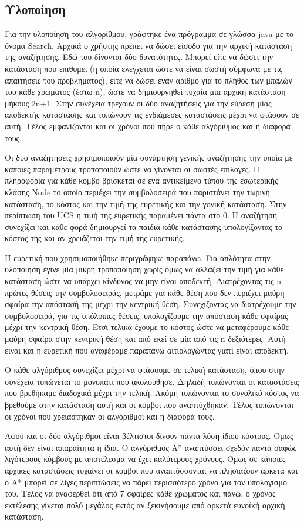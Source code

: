 \documentclass{article}
\begin{document}
\subsection*{Υλοποίηση}
Για την υλοποίηση του αλγορίθμου, γράφτηκε ένα πρόγραμμα σε γλώσσα java με το όνομα Search. Αρχικά ο χρήστης πρέπει να δώσει είσοδο για την αρχική κατάσταση της αναζήτησης. Εδώ του δίνονται δύο δυνατότητες. Μπορεί είτε να δώσει την κατάσταση που επιθυμεί (η οποία ελέγχεται ώστε να είναι σωστή σύμφωνα με τις απαιτήσεις του προβλήματος), είτε να δώσει έναν αριθμό για το πλήθος των μπαλών του κάθε χρώματος (έστω n), ώστε να δημιουργηθεί τυχαία μία αρχική κατάσταση μήκους 2n+1. Στην συνέχεια τρέχουν οι δύο αναζητήσεις για την εύρεση μίας αποδεκτής κατάστασης και τυπώνουν τις ενδιάμεσες καταστάσεις μέχρι να φτάσουν σε αυτή. Τέλος εμφανίζονται και οι χρόνοι που πήρε ο κάθε αλγόριθμος και η διαφορά τους. \par
Οι δύο αναζητήσεις χρησιμοποιούν μία συνάρτηση γενικής αναζήτησης την οποία με κάποιες παραμέτρους τροποποιούν ώστε να γίνονται οι σωστές επιλογές. Η πληροφορία για κάθε κόμβο βρίσκεται σε ένα αντικείμενο τύπου της εσωτερικής κλάσης Node το οποίο περιέχει την συμβολοσειρά που παριστάνει την τωρινή κατάσταση, το κόστος και την τιμή της ευρετικής και την γονική κατάσταση. Στην περίπτωση του UCS η τιμή της ευρετικής παραμένει πάντα στο 0. Η αναζήτηση συνεχίζει και κάθε φορά δημιουργεί τα παιδιά κάθε κατάστασης υπολογίζοντας το κόστος της και αν χρειάζεται την τιμή της ευρετικής.\par
Ή ευρετική που χρησιμοποιήθηκε περιγράφηκε παραπάνω. Για απλότητα στην υλοποίηση έγινε μία μικρή τροποποίηση χωρίς όμως να αλλάζει την τιμή για κάθε κατάσταση ώστε να υπάρχει κίνδυνος να μην είναι αποδεκτή. Διατρέχοντας τις n πρώτες θέσεις την συμβολοσειράς, μετράμε για κάθε θέση που δεν περιέχει μαύρη σφαίρα την απόστασή της μέχρι την κεντρική θέση. Συνεχίζοντας να διατρέχουμε την συμβολοσειρά, για τις υπόλοιπες θέσεις, υπολογίζουμε την απόσταση κάθε σφαίρας μέχρι την κεντρική θέση. Έτσι τελικά έχουμε το κόστος ώστε να μεταφέρουμε κάθε μαύρη σφαίρα στην κεντρική θέση και από εκεί σε μία από τις n δεξιότερες. Αυτή είναι και η ευρετική που αναφέραμε παραπάνω αιτιολογώντας γιατί είναι αποδεκτή. \par
Ο κάθε αλγόριθμος συνεχίζει μέχρι να φτάσουμε σε τελική κατάσταση, όπου στην συνέχεια τυπώνεται το μονοπάτι που ακολούθησε. Δηλαδή τυπώνονται οι καταστάσεις που βρεθήκαμε διαδοχικά μέχρι την τελική. Ακόμη τυπώνονται το συνολικό κόστος να βρεθούμε στην κατάσταση αυτή και οι κόμβοι που αναπτύχθηκαν. Τέλος τυπώνονται οι χρόνοι που χρειάστηκαν οι αλγόριθμοι και η διαφορά τους.\par 
Αφού και οι δύο αλγόριθμοι είναι βέλτιστοι δίνουν πάντα λύση ίδιου κόστους. Όμως αυτή δεν είναι απαραίτητα η ίδια. Ο αλγόριθμος A* αναπτύσσει σχεδόν πάντα σαφώς λιγότερους κόμβους με αποτέλεσμα να έχει καλύτερους χρόνους. Όμως σε κάποιες αρχικές καταστάσεις τυχαίνει οι κόμβοι που αναπτύσσονται να πλησιάζουν αρκετά και ο A* μπορεί σε λίγες περιπτώσεις να πάρει περισσότερο χρόνο για τον υπολογισμό του. Τέλος να αναφερθεί ότι από 7 σφαίρες κάθε χρώματος και πάνω, ο χρόνος εκτέλεσης γίνεται πολύ μεγάλος εκτός αν ξεκινήσουμε από αρκετά ευνοϊκή αρχική κατάσταση.
\newpage
\end{document}
